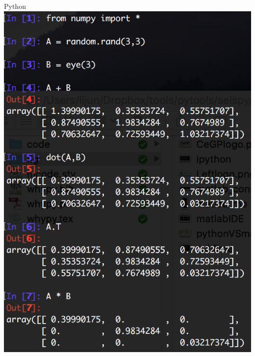 \documentclass[compress]{beamer}
\begin{document}
\begin{frame}
\begin{minipage}{0.35\textwidth}
	\end{minipage}
	\begin{minipage}{0.53\textwidth}
		\centering
		Python\\
		\includegraphics[width=\textwidth]{fig/python_mo}
	\end{minipage}
\end{frame}
\end{document}
